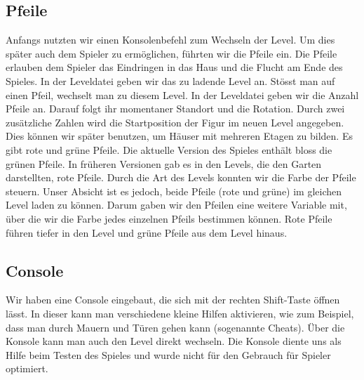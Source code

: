 \documentclass[11pt,a4paper]{scrbook}
\begin{document}
\subsection{Pfeile}
\label{Pfeile}
Anfangs nutzten wir einen Konsolenbefehl zum Wechseln der Level.
Um dies später auch dem Spieler zu ermöglichen, führten wir die Pfeile ein.
Die Pfeile erlauben dem Spieler das Eindringen in das Haus und die Flucht am Ende des Spieles.
In der Leveldatei geben wir das zu ladende Level an. Stösst man auf einen Pfeil, wechselt man zu diesem Level. In der Leveldatei geben wir die Anzahl Pfeile an. Darauf folgt ihr momentaner Standort und die Rotation. Durch zwei zusätzliche Zahlen wird die Startposition der Figur im neuen Level angegeben. Dies können wir später benutzen, um Häuser mit mehreren Etagen zu bilden.
Es gibt rote und grüne Pfeile. 
Die aktuelle Version des Spieles enthält bloss die grünen Pfeile.
In früheren Versionen gab es in den Levels, die den Garten darstellten, rote Pfeile.
Durch die Art des Levels konnten wir die Farbe der Pfeile steuern.
Unser Absicht ist es jedoch, beide Pfeile (rote und grüne) im gleichen Level laden zu können.
Darum gaben wir den Pfeilen eine weitere Variable mit, über die wir die Farbe jedes einzelnen Pfeils bestimmen können.
Rote Pfeile führen tiefer in den Level und grüne Pfeile aus dem Level hinaus.

\subsection{Console}
Wir haben eine Console eingebaut, die sich mit der rechten Shift-Taste öffnen lässt. 
In dieser kann man verschiedene kleine Hilfen aktivieren, 
wie zum Beispiel, dass man durch Mauern und Türen gehen kann (sogenannte Cheats). 
Über die Konsole kann man auch den Level direkt wechseln.
Die Konsole diente uns als Hilfe beim Testen des Spieles und wurde nicht für den Gebrauch für Spieler optimiert.
\end{document}
